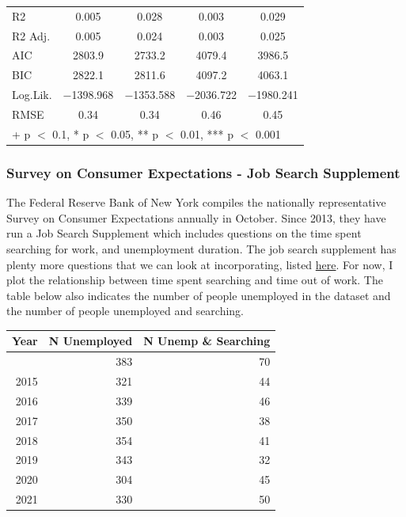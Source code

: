 \documentclass[
]{article}
\begin{document}
\begin{table}
\begin{tabular}[t]{lcccc}
R2 & \num{0.005} & \num{0.028} & \num{0.003} & \num{0.029}\\
R2 Adj. & \num{0.005} & \num{0.024} & \num{0.003} & \num{0.025}\\
AIC & \num{2803.9} & \num{2733.2} & \num{4079.4} & \num{3986.5}\\
BIC & \num{2822.1} & \num{2811.6} & \num{4097.2} & \num{4063.1}\\
Log.Lik. & \num{-1398.968} & \num{-1353.588} & \num{-2036.722} & \num{-1980.241}\\
RMSE & \num{0.34} & \num{0.34} & \num{0.46} & \num{0.45}\\
\bottomrule
\multicolumn{5}{l}{\rule{0pt}{1em}+ p $<$ 0.1, * p $<$ 0.05, ** p $<$ 0.01, *** p $<$ 0.001}\\
\end{tabular}
\end{table}

\subsubsection{Survey on Consumer Expectations - Job Search
Supplement}\label{survey-on-consumer-expectations---job-search-supplement}

The Federal Reserve Bank of New York compiles the nationally
representative Survey on Consumer Expectations annually in October.
Since 2013, they have run a Job Search Supplement which includes
questions on the time spent searching for work, and unemployment
duration. The job search supplement has plenty more questions that we
can look at incorporating, listed
\href{https://www.newyorkfed.org/medialibrary/Interactives/sce/sce/downloads/data/SCE-Labor-Market-Survey-Data-Codebook.pdf?sc_lang=en}{here}.
For now, I plot the relationship between time spent searching and time
out of work. The table below also indicates the number of people
unemployed in the dataset and the number of people unemployed and
searching.

\begin{longtable}[]{@{}rrr@{}}
\toprule\noalign{}
Year & N Unemployed & N Unemp \& Searching \\
\midrule\noalign{}
\endhead
\bottomrule\noalign{}
\endlastfoot
2014 & 383 & 70 \\
2015 & 321 & 44 \\
2016 & 339 & 46 \\
2017 & 350 & 38 \\
2018 & 354 & 41 \\
2019 & 343 & 32 \\
2020 & 304 & 45 \\
2021 & 330 & 50 \\
\end{longtable}
\end{document}

